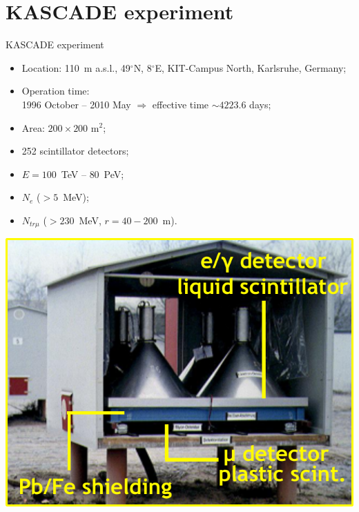\section{KASCADE experiment}

\begin{frame}{KASCADE experiment}
\begin{itemize}
\item Location: 110~m a.s.l., 49$^\circ$N, 8$^\circ$E, KIT-Campus North, Karlsruhe, Germany;
\end{itemize}
\vspace{-\itemsep}
\begin{minipage}[c]{0.5\textwidth}
\begin{itemize}
\item Operation time:\\1996 October -- 2010 May $\Rightarrow$ effective time $\sim 4223.6$ days;
\item Area: $200 \times 200$ m$^2$;
\item 252 scintillator detectors;
\item $E = 100$~TeV -- $80$~PeV;
\item $N_e$ ($> 5$~MeV);
\item $N_{tr \mu}$ ($> 230$~MeV, $r = 40 - 200$~m).
\end{itemize}
\end{minipage}\hfill
\begin{minipage}[c]{0.49\textwidth}
\includegraphics[width=1\textwidth]{pics/KASCADE-station.pdf}
\end{minipage}
\end{frame}

